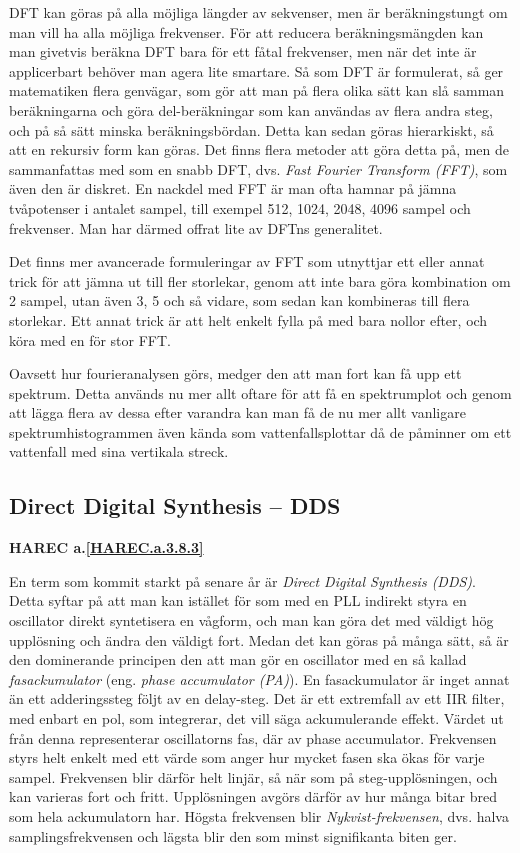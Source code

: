 DFT kan göras på alla möjliga längder av sekvenser, men är beräkningstungt
om man vill ha alla möjliga frekvenser.
För att reducera beräkningsmängden kan man givetvis beräkna DFT bara för ett
fåtal frekvenser, men när det inte är applicerbart behöver man agera lite
smartare.
Så som DFT är formulerat, så ger matematiken flera genvägar, som gör att man
på flera olika sätt kan slå samman beräkningarna och göra del-beräkningar som
kan användas av flera andra steg, och på så sätt minska beräkningsbördan.
Detta kan sedan göras hierarkiskt, så att en rekursiv form kan göras.
Det finns flera metoder att göra detta på, men de sammanfattas med som en
snabb DFT, dvs. \emph{Fast Fourier Transform (FFT)}, som även den är diskret.
En nackdel med FFT är man ofta hamnar på jämna tvåpotenser i antalet sampel,
till exempel 512, 1024, 2048, 4096 sampel och frekvenser.
Man har därmed offrat lite av DFTns generalitet.

Det finns mer avancerade formuleringar av FFT som utnyttjar ett eller annat
trick för att jämna ut till fler storlekar, genom att inte bara göra
kombination om 2 sampel, utan även 3, 5 och så vidare, som sedan kan kombineras till
flera storlekar.
Ett annat trick är att helt enkelt fylla på med bara nollor efter, och köra
med en för stor FFT.

Oavsett hur fourieranalysen görs, medger den att man fort kan få upp ett
spektrum.
Detta används nu mer allt oftare för att få en spektrumplot och genom att
lägga flera av dessa efter varandra kan man få de nu mer allt vanligare
spektrumhistogrammen även kända som vattenfallsplottar då de påminner om ett
vattenfall med sina vertikala streck.

\subsection{Direct Digital Synthesis -- DDS}
\textbf{HAREC a.\ref{HAREC.a.3.8.3}\label{myHAREC.a.3.8.3}}

En term som kommit starkt på senare år är \emph{Direct Digital Synthesis (DDS)}.
Detta syftar på att man kan istället för som med en PLL indirekt styra en
oscillator direkt syntetisera en vågform, och man kan göra det med väldigt
hög upplösning och ändra den väldigt fort.
Medan det kan göras på många sätt, så är den dominerande principen den att
man gör en oscillator med en så kallad \emph{fasackumulator} (eng. \emph{phase
 accumulator (PA)}).
En fasackumulator är inget annat än ett adderingssteg följt av en delay-steg.
Det är ett extremfall av ett IIR filter, med enbart en pol, som integrerar,
det vill säga ackumulerande effekt.
Värdet ut från denna representerar oscillatorns fas, där av phase accumulator.
Frekvensen styrs helt enkelt med ett värde som anger hur mycket fasen ska
ökas för varje sampel.
Frekvensen blir därför helt linjär, så när som på steg-upplösningen, och kan
varieras fort och fritt.
Upplösningen avgörs därför av hur många bitar bred som hela ackumulatorn har.
Högsta frekvensen blir \emph{Nykvist-frekvensen}, dvs. halva
samplingsfrekvensen och lägsta blir den som minst signifikanta biten ger.

